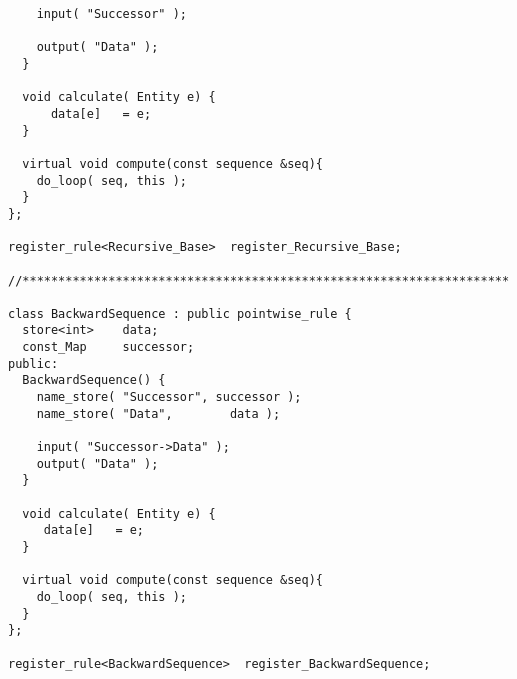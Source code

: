 \begin{verbatim}
    input( "Successor" );

    output( "Data" );
  }

  void calculate( Entity e) {
      data[e]   = e;
  }

  virtual void compute(const sequence &seq){
    do_loop( seq, this );
  }
};

register_rule<Recursive_Base>  register_Recursive_Base;

//********************************************************************

class BackwardSequence : public pointwise_rule {
  store<int>    data;
  const_Map     successor;
public:
  BackwardSequence() {
    name_store( "Successor", successor );
    name_store( "Data",        data );

    input( "Successor->Data" );
    output( "Data" );
  }

  void calculate( Entity e) {
     data[e]   = e;
  }

  virtual void compute(const sequence &seq){
    do_loop( seq, this );
  }
};

register_rule<BackwardSequence>  register_BackwardSequence;

\end{verbatim}

